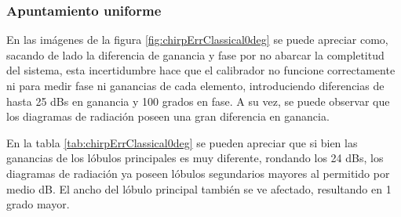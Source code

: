 \subsubsection{Apuntamiento uniforme}

En las imágenes de la figura \ref{fig:chirpErrClassical0deg} se puede apreciar como, sacando de lado la diferencia de 
ganancia y fase por no abarcar la completitud del sistema, esta incertidumbre hace que el calibrador no funcione correctamente 
ni para medir fase ni ganancias de cada elemento, introduciendo diferencias de hasta 25 dBs en ganancia y 100 grados en fase.
A su vez, se puede observar que los diagramas de radiación poseen una gran diferencia en ganancia.

En la tabla \ref{tab:chirpErrClassical0deg} se pueden apreciar que si bien las ganancias de los lóbulos principales es muy 
diferente, rondando los 24 dBs, los diagramas de radiación ya poseen lóbulos segundarios mayores al permitido por medio dB. El 
ancho del lóbulo principal también se ve afectado, resultando en 1 grado mayor.

